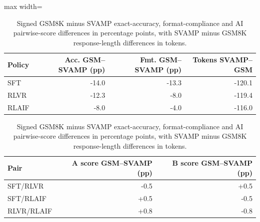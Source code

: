 \begin{table}[!htbp]
\centering
\caption{Signed GSM8K minus SVAMP exact-accuracy, format-compliance and AI pairwise-score differences in percentage points, with SVAMP minus GSM8K response-length differences in tokens.}
\label{tab:task5-transfer}
\scriptsize
\setlength{\tabcolsep}{4pt}
\begin{adjustbox}{max width=\linewidth}
\begin{tabular}{lrrr}
\toprule
Policy & Acc. GSM--SVAMP (pp) & Fmt. GSM--SVAMP (pp) & Tokens SVAMP--GSM \\
\midrule
SFT & -14.0 & -13.3 & -120.1 \\
RLVR & -12.3 & -8.0 & -119.4 \\
RLAIF & -8.0 & -4.0 & -116.0 \\
\bottomrule
\end{tabular}
\end{adjustbox}

\medskip
\begin{tabular}{lrr}
\toprule
Pair & A score GSM--SVAMP (pp) & B score GSM--SVAMP (pp) \\
\midrule
SFT/RLVR & -0.5 & +0.5 \\
SFT/RLAIF & +0.5 & -0.5 \\
RLVR/RLAIF & +0.8 & -0.8 \\
\bottomrule
\end{tabular}
\end{table}
